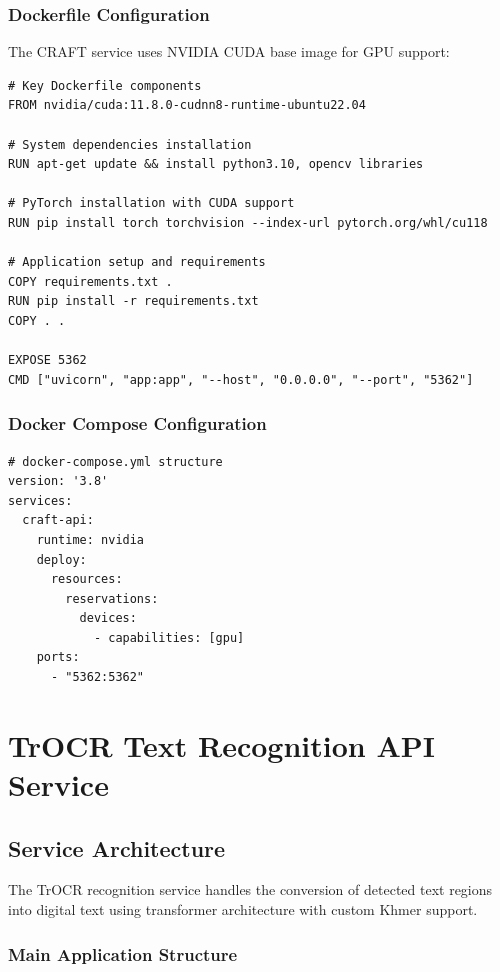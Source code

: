 {\subsubsection*{Dockerfile Configuration}

The CRAFT service uses NVIDIA CUDA base image for GPU support:

\begin{verbatim}
# Key Dockerfile components
FROM nvidia/cuda:11.8.0-cudnn8-runtime-ubuntu22.04

# System dependencies installation
RUN apt-get update && install python3.10, opencv libraries

# PyTorch installation with CUDA support
RUN pip install torch torchvision --index-url pytorch.org/whl/cu118

# Application setup and requirements
COPY requirements.txt .
RUN pip install -r requirements.txt
COPY . .

EXPOSE 5362
CMD ["uvicorn", "app:app", "--host", "0.0.0.0", "--port", "5362"]
\end{verbatim}

\subsubsection*{Docker Compose Configuration}

\begin{verbatim}
# docker-compose.yml structure
version: '3.8'
services:
  craft-api:
    runtime: nvidia
    deploy:
      resources:
        reservations:
          devices:
            - capabilities: [gpu]
    ports:
      - "5362:5362"
\end{verbatim}

\section{TrOCR Text Recognition API Service}
\label{sec:trocr-api}

\subsection{Service Architecture}
\label{subsec:trocr-architecture}

The TrOCR recognition service handles the conversion of detected text regions into digital text using transformer architecture with custom Khmer support.

\subsubsection*{Main Application Structure}

}
